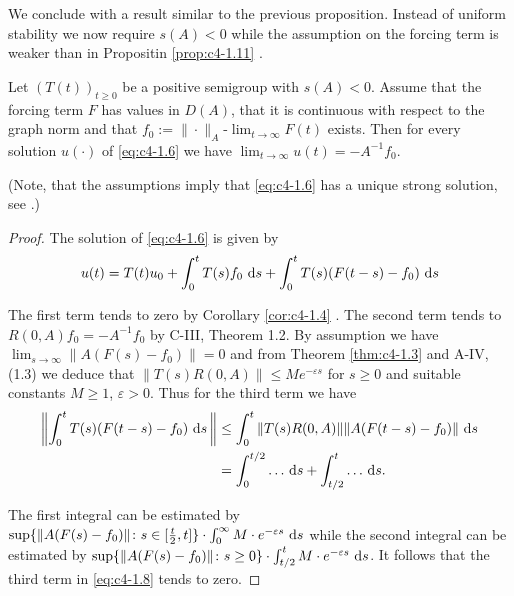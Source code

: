 We conclude with a result similar to the previous proposition.
Instead of uniform stability we now require $s(A) < 0$ while the assumption on the forcing term is weaker than in Propositin \ref{prop:c4-1.11} .

\begin{proposition}\label{prop:c4-1.12}
Let $(T(t))_{t \geq 0}$ be a positive semigroup with $s(A) < 0$.
Assume that the forcing term $F$ has values in $D(A)$, that it is continuous with respect to the graph norm and that $f_{0} := \|\cdot\|_{A}$-$\lim_{t \to \infty} F(t)$ exists.
Then for every solution $u(\cdot)$ of \eqref{eq:c4-1.6} we have $\lim_{t \to \infty} u(t) = -A^{-1}f_{0}$.

(Note, that the assumptions imply that \eqref{eq:c4-1.6} has a unique strong solution, see \citet[ Theorem~4.2.4]{pazy:1983}.)
\end{proposition}

\begin{proof}
The solution of \eqref{eq:c4-1.6} is given by
\begin{equation}\label{eq:c4-1.8}
u(t) = T(t)u_{0} + \int_{0}^{t} T(s)f_{0} \, \mathop{}\!\mathrm{d}{s} + \int_{0}^{t} T(s)(F(t-s)-f_{0}) \, \mathop{}\!\mathrm{d}{s}
\end{equation}

The first term tends to zero by Corollary \ref{cor:c4-1.4} .
The second term tends to $R(0,A)f_{0} = -A^{-1}f_{0}$ by C-III, Theorem 1.2.
By assumption we have $\lim_{s \to \infty}\|A(F(s)-f_{0})\| = 0$ and from Theorem \ref{thm:c4-1.3} and A-IV, (1.3) we deduce that $\|T(s)R(0,A)\| \leq Me^{-\varepsilon s}$ for $s \geq 0$ and suitable constants $M \geq 1$, $\varepsilon > 0$.
Thus for the third term we have
\begin{align*}
\left\|\int_{0}^{t} T(s)(F(t-s)-f_{0}) \, \mathop{}\!\mathrm{d}{s}\,\right\| &\leq \int_{0}^{t} \|T(s)R(0,A)\| \|A(F(t-s)-f_{0})\| \, \mathop{}\!\mathrm{d}{s} \\
&= \int_{0}^{t/2} \ldots \, \mathop{}\!\mathrm{d}{s} + \int_{t/2}^{t} \ldots \, \mathop{}\!\mathrm{d}{s}.
\end{align*}

The first integral can be estimated by\\ $\sup\{\|A(F(s)-f_{0})\| \colon s \in [\frac{t}{2},t]\} \cdot \int_{0}^{\infty} M \cdot e^{-\varepsilon s} \, \mathop{}\!\mathrm{d}{s}$ while the second integral can be estimated by $\sup\{\|A(F(s)-f_{0})\| \colon s \geq 0\} \cdot \int_{t/2}^{t} M \cdot e^{- \varepsilon s} \, \mathop{}\!\mathrm{d}{s}$.
It follows that the third term in \eqref{eq:c4-1.8} tends to zero.
\end{proof}
